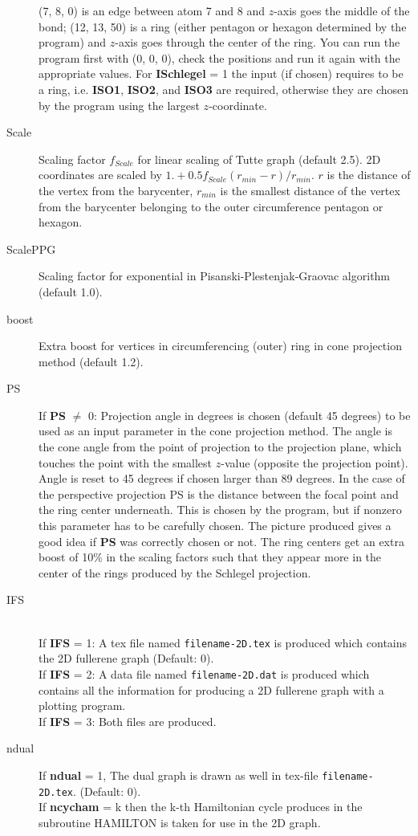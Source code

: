 \documentclass[article,a4paper,twoside]{memoir}
\newcommand{\filename}[1]{\texttt{#1}}
\newcommand{\paramname}[1]{{\color{green}\textbf{#1}}}
\begin{document}
\begin{description}
  (7, 8, 0) is an edge between atom 7 and 8 and $z$-axis goes the middle of the bond; (12, 13, 50) is a ring (either pentagon or hexagon determined
  by the program) and $z$-axis goes through the center of the ring. You can run the program first with (0, 0, 0), check the positions
  and run it again with the appropriate values. For \paramname{ISchlegel} = 1 the input (if chosen) requires to be a ring, i.e.
  \paramname{ISO1}, \paramname{ISO2}, and \paramname{ISO3} are required, otherwise they are chosen by the program using the largest $z$-coordinate.\\
\item[Scale] 
  Scaling factor $f_{Scale}$ for linear scaling of Tutte graph (default  2.5). 2D coordinates are scaled by 
  $1.+0.5f_{Scale}(r_{min}-r)/r_{min}$. $r$ is the distance of the vertex from the barycenter, $r_{min}$ is the smallest distance of the vertex 
  from the barycenter belonging to the outer circumference pentagon or hexagon.
\item[ScalePPG] 
  Scaling factor for exponential in Pisanski-Plestenjak-Graovac algorithm \cite{pisanski95} (default 1.0).
\item[boost] 
  Extra boost for vertices in circumferencing (outer) ring in cone projection method (default 1.2).
\item[PS] 
  If \paramname{PS} $\ne$ 0: Projection angle in degrees is chosen (default 45 degrees)
to be used as an input parameter in the cone projection method. The angle is the cone angle from the point of projection 
to the projection plane, which touches the point with the smallest $z$-value (opposite the projection point). Angle is reset 
to 45 degrees if chosen larger than 89 degrees.  In the case of the perspective projection PS is the distance
between the focal point and the ring center underneath.  This is chosen by the program, but if nonzero this parameter has to be
carefully chosen. The picture produced gives a good idea if \paramname{PS} was correctly chosen or not. The ring centers get
an extra boost of 10\% in the scaling factors such that they appear more in the center of the rings produced by the Schlegel projection.
\item[IFS]\ \\
If \paramname{IFS} = 1: A tex file named \filename{filename-2D.tex} is produced which contains the 2D fullerene graph (Default: 0).\\
If \paramname{IFS} = 2: A data file named \filename{filename-2D.dat} is produced which contains all the information 
for producing a 2D fullerene graph with a plotting program.\\
If \paramname{IFS} = 3: Both files are produced.
\item[ndual] 
If \paramname{ndual} = 1, The dual graph is drawn as well in tex-file \filename{filename-2D.tex}. (Default: 0).\\
If \paramname{ncycham} = k then the k-th Hamiltonian cycle produces in the subroutine HAMILTON is taken for use in
the 2D graph.\\
\end{description}
\end{document}

